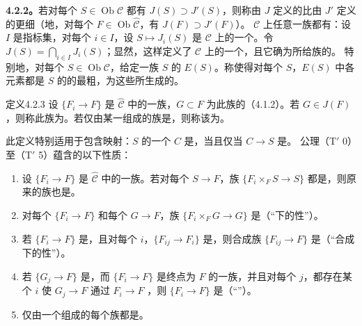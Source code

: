 \textbf{4.2.2。}若对每个 $S\in\operatorname{Ob}\mathcal C$ 都有 $J(S)\supset J'(S)$，则称由 $J$ 定义的比由 $J'$ 定义的更细（地，对每个 $F\in\operatorname{Ob}\widehat{\mathcal C}$，有 $J(F)\supset J'(F)$）。
$\mathcal C$ 上任意一族都有：设 $I$ 是指标集，对每个 $i\in I$，设 $S\mapsto J_i(S)$ 是 $\mathcal C$ 上的一个。令 $J(S)=\bigcap_{i\in I}J_i(S)$；显然，这样定义了 $\mathcal C$ 上的一个，且它确为所给族的。
特别地，对每个 $S\in\operatorname{Ob}\mathcal C$，给定一族 $S$ 的 $E(S)$。称使得对每个 $S$，$E(S)$ 中各元素都是 $S$ 的的最粗，为这些所生成的。
\begin{SGAresult}{定义}{4.2.3}
设 $\{F_i\to F\}$ 是 $\widehat{\mathcal C}$ 中的一族，$G\subset F$ 为此族的（4.1.2）。若 $G\in J(F)$，则称此族为。若仅由某一组成的族是，则称该为。
\end{SGAresult}
此定义特别适用于包含映射：$S$ 的一个 $C$ 是，当且仅当 $C\to S$ 是。
公理（T$'$ 0）至（T$'$ 5）蕴含的以下性质：
\begin{enumerate}
\item[（C 0）] 设 $\{F_i\to F\}$ 是 $\widehat{\mathcal C}$ 中的一族。若对每个 $S\to F$，族 $\{F_i\times_F S\to S\}$ 都是，则原来的族也是。
\item[（C 1）] 对每个 $\{F_i\to F\}$ 和每个 $G\to F$，族 $\{F_i\times_F G\to G\}$ 是（“下的性”）。
\item[（C 2）] 若 $\{F_i\to F\}$ 是，且对每个 $i$，$\{F_{ij}\to F_i\}$ 是，则合成族 $\{F_{ij}\to F\}$ 是（“合成下的性”）。
\item[（C 3）] 若 $\{G_j\to F\}$ 是，而 $\{F_i\to F\}$ 是终点为 $F$ 的一族，并且对每个 $j$，都存在某个 $i$ 使 $G_j\to F$ 通过 $F_i\to F$ ，则 $\{F_i\to F\}$ 是（“”）。
\item[（C 4）] 仅由一个组成的每个族都是。
\end{enumerate}
